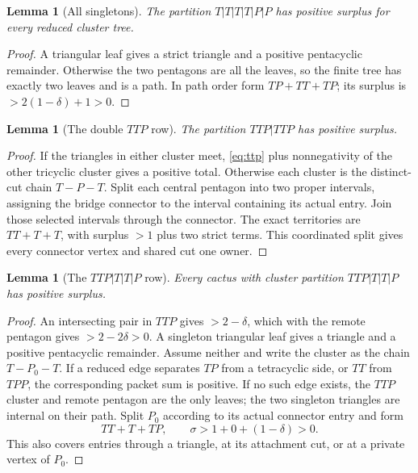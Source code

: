 \documentclass[11pt]{article}
\newtheorem{lemma}[theorem]{Lemma}
\newcommand{\sig}{\sigma}
\begin{document}
\begin{lemma}[All singletons]\label{lem:all-singletons}
The partition $T|T|T|T|P|P$ has positive surplus for every reduced cluster
tree.
\end{lemma}
\begin{proof}
A triangular leaf gives a strict triangle and a positive pentacyclic
remainder.  Otherwise the two pentagons are all the leaves, so the finite tree
has exactly two leaves and is a path.  In path order form $TP+TT+TP$; its
surplus is $>2(1-\delta)+1>0$.
\end{proof}

\begin{lemma}[The double $TTP$ row]\label{lem:double-ttp}
The partition $TTP|TTP$ has positive surplus.
\end{lemma}
\begin{proof}
If the triangles in either cluster meet, \eqref{eq:ttp} plus nonnegativity of
the other tricyclic cluster gives a positive total.  Otherwise each cluster is
the distinct-cut chain $T-P-T$.  Split each central pentagon into two proper
intervals, assigning the bridge connector to the interval containing its
actual entry.  Join those selected intervals through the connector.  The exact
territories are $TT+T+T$, with surplus $>1$ plus two strict terms.  This
coordinated split gives every connector vertex and shared cut one owner.
\end{proof}

\begin{lemma}[The $TTP|T|T|P$ row]\label{lem:ttp-ttp}
Every cactus with cluster partition $TTP|T|T|P$ has positive surplus.
\end{lemma}
\begin{proof}
An intersecting pair in $TTP$ gives $>2-\delta$, which with the remote
pentagon gives $>2-2\delta>0$.  A singleton triangular leaf gives a triangle
and a positive pentacyclic remainder.  Assume neither and write the cluster as
the chain $T-P_0-T$.  If a reduced edge separates $TP$ from a tetracyclic
side, or $TT$ from $TPP$, the corresponding packet sum is positive.  If no
such edge exists, the $TTP$ cluster and remote pentagon are the only leaves;
the two singleton triangles are internal on their path.  Split $P_0$ according
to its actual connector entry and form
\[
 TT+T+TP,
 \qquad \sig>1+0+(1-\delta)>0.
\]
This also covers entries through a triangle, at its attachment cut, or at a
private vertex of $P_0$.
\end{proof}
\end{document}
